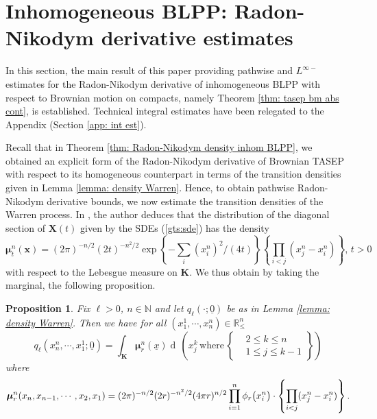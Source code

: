 \documentclass[11pt, reqno]{amsart}
\numberwithin{equation}{section}
\newcounter{dummy} \numberwithin{dummy}{section}
\newtheorem{proposition}[dummy]{Proposition}
\newcommand{\N}{\ensuremath{\mathbb{N}}}
\newcommand{\R}{\ensuremath{\mathbb{R}}}
\newcommand{\diff}{\ensuremath{\operatorname{d}\!}}
\begin{document}
\section{Inhomogeneous BLPP: Radon-Nikodym derivative estimates}\label{sec: BM tasep rn estimates}

In this section, the main result of this paper providing pathwise and $L^{\infty-}$ estimates for the Radon-Nikodym derivative of inhomogeneous BLPP with respect to Brownian motion on compacts, namely Theorem \ref{thm: tasep bm abs cont}, is established. Technical integral estimates have been relegated to the Appendix (Section \ref{app: int est}). 

Recall that in Theorem \ref{thm: Radon-Nikodym  density inhom BLPP}, we obtained an explicit form of the Radon-Nikodym derivative of Brownian TASEP with respect to its homogeneous counterpart in terms of the transition densities given in Lemma \ref{lemma: density Warren}. Hence, to obtain pathwise Radon-Nikodym derivative bounds, we now estimate the transition densities of the Warren process. In \cite{warren2007dyson}, the author deduces that the distribution of the diagonal section of
${\mathbf X}(t)$ given by the SDEs (\ref{gts:sde}) has the density
\begin{equation*}
\label{entrance:gts}
\boldsymbol{\mu}^n_t({\mathbf x}) = (2\pi)^{-n/2} (2t)^{-n^2/2} \exp \left\{ -\sum_{i} (x^n_i)^2/(4t)\right\} \left\{ \displaystyle\prod_{i<j} (x^n_j-x^n_i) 
\right\},\, t > 0
\end{equation*}
with respect to the Lebesgue measure on ${\mathbf K}$. We thus obtain by taking the marginal, the following proposition. 

\begin{proposition}\label{prop: lb density 1}
    Fix $\ell>0$, $n\in \N $ and let $q_\ell (\cdot; \underline{0})$ be as in Lemma \ref{lemma: density Warren}. Then we have for all $(x^1_1, \cdots, x^n_n)\in \R^n_{\le}$
    \begin{equation*}
        q_{\ell}(x^n_n, \cdots, x^1_1; \underline{0}) =  \displaystyle\int_{\boldsymbol{K}} \boldsymbol{\mu}^n_{r}(\underline{x})\diff\, \left(x^k_j\, \mathrm{where}\, \left.\begin{cases}
       &2\le k \le n\\
       &1\le j \le k-1
   \end{cases}\right\} \right)
\end{equation*}
where 
\begin{equation*}
\boldsymbol{\mu}^n_{r}(x_n, x_{n-1}, \cdots, x_2, x_1) = (2\pi)^{-n/2} (2r)^{-n^2/2}(4\pi r)^{n/2} \displaystyle\prod_{i=1}^n \phi_r\big(x^n_i\big) \cdot\left\{ \displaystyle\displaystyle\prod_{i<j} (x^n_j-x^n_i) 
\right\}.
\end{equation*}
\end{proposition}
\end{document}

